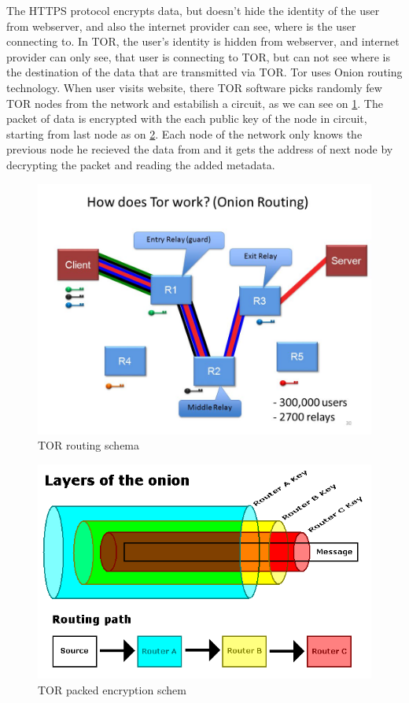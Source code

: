 \documentclass[
  digital, %
  table,   %
  lof,     %
  lot,     %
  oneside
]{fithesis3}
\begin{document}
The HTTPS protocol encrypts data, but doesn't hide the identity of the user from webserver,
 and also the internet provider can see, where is the user connecting to.
 In TOR, the user's identity is hidden from webserver, and internet provider can only see, that user is connecting to TOR,
 but can not see where is the destination of the data that are transmitted via TOR.
 Tor uses Onion routing technology. When user visits website, there TOR software picks randomly few TOR nodes from the network
 and estabilish a circuit, as we can see on \ref{TOR routing schema}. 
 The packet of data is encrypted with the each public key of the node in circuit, starting from last node as on \ref{TOR packed encryption schema}.
 Each node of the network only knows the previous node he recieved the data from and it gets the address 
 of next node by decrypting the packet and reading the added metadata.
 
 \begin{figure}[!htb]
    \centering
    \includegraphics[width=1\textwidth]{tor-prejate}
    \caption{TOR routing schema}
    \label{TOR routing schema}
\end{figure}
 
  \begin{figure}[!htb]
    \centering
    \includegraphics[width=1\textwidth]{tor-packet-prejate}
    \caption{TOR packed encryption schem}
    \label{TOR packed encryption schema}
\end{figure}
 
\end{document}
